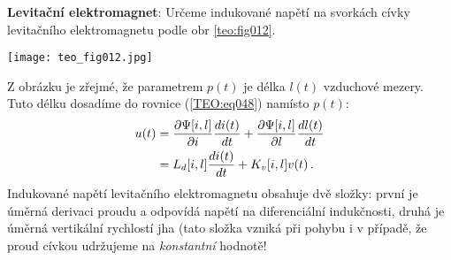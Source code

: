 \begin{example}
  \textbf{Levitační elektromagnet}: Určeme indukované napětí na svorkách cívky levitačního 
  elektromagnetu podle obr \ref{teo:fig012}.
  
   {\centering
    \captionsetup{type=figure}
    \texttt{[image: teo\_fig012.jpg]}
    \label{teo:fig012}
  \par}
  Z obrázku je zřejmé, že parametrem \(p(t)\) je délka \(l(t)\) vzduchové mezery. Tuto délku 
  dosadíme do rovnice (\ref{TEO:eq048}) namísto \(p(t)\):
  \begin{align}\label{TEO:eq076}
    u(t) &= \dfrac{\partial \Psi[i, l]}{\partial i}\dfrac{d i(t)}{d t} + \dfrac{\partial \Psi[i,l]}{\partial l}\dfrac{d l(t)}{d t}  \nonumber \\
         &= L_d[i,l]\dfrac{d i(t)}{d t} + K_v[i,l]v(t)\,.
  \end{align}
  Indukované napětí levitačního elektromagnetu obsahuje dvě složky: první je úměrná derivaci proudu 
  a odpovídá napětí na diferenciální indukčnosti, druhá je úměrná vertikální rychlostí jha (tato 
  složka vzniká při pohybu i v případě, že proud cívkou udržujeme na \emph{konstantní} hodnotě!

\end{example}


